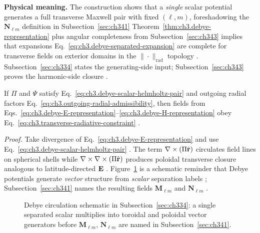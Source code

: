 \textbf{Physical meaning.} The construction shows that a \emph{single} scalar potential generates a full transverse
Maxwell pair with fixed \((\ell,m)\), foreshadowing the \(\mathbf{N}_{\ell m}\) definition in Subsection~\ref{sec:ch341}
Theorem~\ref{thm:ch3.debye-representation} plus angular completeness from Subsection~\ref{sec:ch343} implies that
expansions Eq.~\eqref{eq:ch3.debye-separated-expansion} are complete for transverse fields on exterior domains in
the \(\|\cdot\|_{\mathrm{rad}}\) topology . Subsection~\ref{sec:ch334} states the
generating-side input; Subsection~\ref{sec:ch343} proves the harmonic-side closure .
\begin{proposition}
\label{prop:ch3.debye-div-free}
If \(\Pi\) and \(\Psi\) satisfy Eq.~\eqref{eq:ch3.debye-scalar-helmholtz-pair} and outgoing radial factors
Eq.~\eqref{eq:ch3.outgoing-radial-admissibility}, then fields from
Eqs.~\eqref{eq:ch3.debye-E-representation}--\eqref{eq:ch3.debye-H-representation} obey
Eq.~\eqref{eq:ch3.transverse-radiative-constraint} .
\end{proposition}
\noindent\textit{Proof.}
Take divergence of Eq.~\eqref{eq:ch3.debye-E-representation} and use
Eq.~\eqref{eq:ch3.debye-scalar-helmholtz-pair} .
The term \(\nabla\times(\Pi\hat{\mathbf{r}})\) circulates field lines on spherical shells while
\(\nabla\times\nabla\times(\Pi\hat{\mathbf{r}})\) produces poloidal transverse closure analogous to latitude-directed \(\mathbf{E}\)
. Figure~\ref{fig:ch3.toroidal-poloidal-debye-schematic} is a schematic
reminder that Debye potentials generate \emph{vector} structure from \emph{scalar} separation labels
; Subsection~\ref{sec:ch341} names the resulting fields \(\mathbf{M}_{\ell m}\) and
\(\mathbf{N}_{\ell m}\) .
\begin{figure}[t]
\centering
{}
\caption{Debye circulation schematic in Subsection~\ref{sec:ch334}: a single separated scalar multiplies into
toroidal and poloidal vector generators before \(\mathbf{M}_{\ell m}\), \(\mathbf{N}_{\ell m}\) are named in
Subsection~\ref{sec:ch341}.}
\label{fig:ch3.toroidal-poloidal-debye-schematic}
\end{figure}
